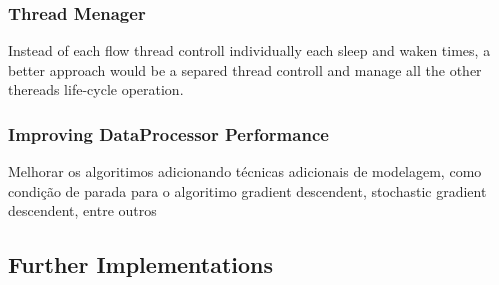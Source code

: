 \subsubsection{Thread Menager}

Instead of each flow thread controll individually each sleep and waken times, a better approach would be a separed thread controll and manage all the other thereads life-cycle operation.


\subsubsection{Improving DataProcessor Performance}

Melhorar os algoritimos adicionando técnicas adicionais de modelagem, como condição de parada para o algoritimo gradient descendent, stochastic gradient descendent, entre outros


\subsection{Further Implementations}


